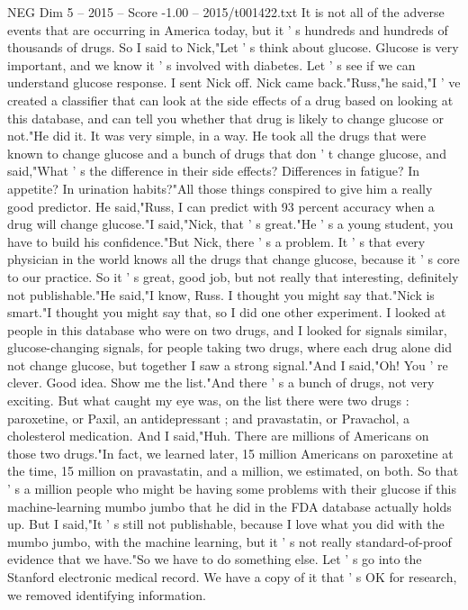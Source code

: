 \begin{textsample}{NEG Dim 5 – 2015 – Score -1.00 – 2015/t001422.txt}
It is not all of the adverse events that are occurring in America today, but it ' s hundreds and hundreds of thousands of drugs.
So I said to Nick,"Let ' s think about glucose.
Glucose is very important, and we know it ' s involved with diabetes.
Let ' s see if we can understand glucose response.
I sent Nick off.
Nick came back."Russ,"he said,"I ' ve created a classifier that can look at the side effects of a drug based on looking at this database, and can tell you whether that drug is likely to change glucose or not."He did it.
It was very simple, in a way.
He took all the drugs that were known to change glucose and a bunch of drugs that don ' t change glucose, and said,"What ' s the difference in their side effects?
Differences in fatigue?
In appetite?
In urination habits?"All those things conspired to give him a really good predictor.
He said,"Russ, I can predict with 93 percent accuracy when a drug will change glucose."I said,"Nick, that ' s great."He ' s a young student, you have to build his confidence."But Nick, there ' s a problem.
It ' s that every physician in the world knows all the drugs that change glucose, because it ' s core to our practice.
So it ' s great, good job, but not really that interesting, definitely not publishable."He said,"I know, Russ.
I thought you might say that."Nick is smart."I thought you might say that, so I did one other experiment.
I looked at people in this database who were on two drugs, and I looked for signals similar, glucose-changing signals, for people taking two drugs, where each drug alone did not change glucose, but together I saw a strong signal."And I said,"Oh!
You ' re clever.
Good idea.
Show me the list."And there ' s a bunch of drugs, not very exciting.
But what caught my eye was, on the list there were two drugs : paroxetine, or Paxil, an antidepressant ; and pravastatin, or Pravachol, a cholesterol medication.
And I said,"Huh.
There are millions of Americans on those two drugs."In fact, we learned later, 15 million Americans on paroxetine at the time, 15 million on pravastatin, and a million, we estimated, on both.
So that ' s a million people who might be having some problems with their glucose if this machine-learning mumbo jumbo that he did in the FDA database actually holds up.
But I said,"It ' s still not publishable, because I love what you did with the mumbo jumbo, with the machine learning, but it ' s not really standard-of-proof evidence that we have."So we have to do something else.
Let ' s go into the Stanford electronic medical record.
We have a copy of it that ' s OK for research, we removed identifying information.

\end{textsample}
